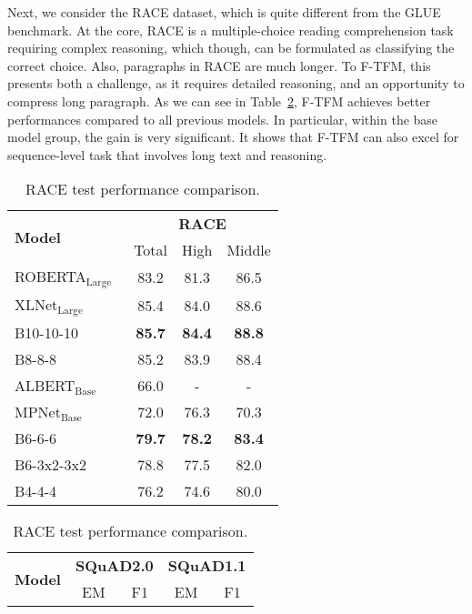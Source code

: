 \documentclass{article}
\theoremstyle{custom}
\begin{document}
Next, we consider the RACE dataset, which is quite different from the GLUE benchmark.
At the core, RACE is a multiple-choice reading comprehension task requiring complex reasoning, which though, can be formulated as classifying the correct choice.
Also, paragraphs in RACE are much longer.
To F-TFM, this presents both a challenge, as it requires detailed reasoning, and an opportunity to compress long paragraph.
As we can see in Table~\ref{tab:race}, F-TFM achieves better performances compared to all previous models.
In particular, within the base model group, the gain is very significant.
It shows that F-TFM can also excel for sequence-level task that involves long text and reasoning.

\begin{table}[!ht]
\centering
\small
\begin{minipage}{0.48\textwidth}
	\centering
	\begin{tabular}{lccc}
		\toprule
		\multirow{2}{*}{\bf Model} & \multicolumn{3}{c}{\bf RACE} \\
		& Total & High & Middle \\
		\cmidrule(r){1-1} \cmidrule(l){2-4}
		ROBERTA$_\text{Large}$~\cite{liu2019roberta}
		& 83.2 & 81.3 & 86.5 \\
		XLNet$_\text{Large}$~\cite{yang2019xlnet}
		& 85.4 & 84.0 & 88.6 \\
		B10-10-10
		& \bf 85.7 & \bf 84.4 & \bf 88.8 \\
		B8-8-8
		& 85.2 & 83.9 & 88.4 \\
		\cmidrule(r){1-1} \cmidrule(l){2-4}
		ALBERT$_\text{Base}$~\cite{lan2019albert}
		& 66.0 & -    & - \\
		MPNet$_\text{Base}$~\cite{song2020mpnet}
		& 72.0 & 76.3 & 70.3 \\
		B6-6-6
		& \bf 79.7 & \bf 78.2 & \bf 83.4 \\
		B6-3x2-3x2
		& 78.8 & 77.5 & 82.0 \\
		B4-4-4
		& 76.2 & 74.6 & 80.0 \\  
		\bottomrule 
	\end{tabular}
	\caption{RACE test performance comparison.}
	\label{tab:race}
\end{minipage}\hfill
\begin{minipage}{0.48\textwidth}
	\begin{tabular}{lcccc}
		\toprule
		\multirow{2}{*}{\bf Model} & \multicolumn{2}{c}{\bf SQuAD2.0} & \multicolumn{2}{c}{\bf SQuAD1.1} \\
		& EM & F1 & EM & F1 \\

\end{tabular}
\end{minipage}
\end{table}
\end{document}
